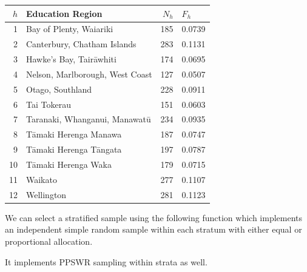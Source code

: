\documentclass[
]{book}
\begin{document}
\begin{table}
\centering
\begin{tabular}[t]{r|l|r|l}
\hline
$h$ & Education Region & $N_h$ & $F_h$\\
\hline
1 & Bay of Plenty, Waiariki & 185 & 0.0739\\
\hline
2 & Canterbury, Chatham Islands & 283 & 0.1131\\
\hline
3 & Hawke's Bay, Tairāwhiti & 174 & 0.0695\\
\hline
4 & Nelson, Marlborough, West Coast & 127 & 0.0507\\
\hline
5 & Otago, Southland & 228 & 0.0911\\
\hline
6 & Tai Tokerau & 151 & 0.0603\\
\hline
7 & Taranaki, Whanganui, Manawatū & 234 & 0.0935\\
\hline
8 & Tāmaki Herenga Manawa & 187 & 0.0747\\
\hline
9 & Tāmaki Herenga Tāngata & 197 & 0.0787\\
\hline
10 & Tāmaki Herenga Waka & 179 & 0.0715\\
\hline
11 & Waikato & 277 & 0.1107\\
\hline
12 & Wellington & 281 & 0.1123\\
\hline
\end{tabular}
\end{table}

We can select a stratified sample using the following function
which implements an independent simple random sample within
each stratum with either equal or proportional allocation.

It implements PPSWR sampling within strata as well.
\end{document}
